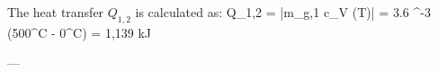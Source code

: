 The heat transfer \( Q_{1,2} \) is calculated as:  
Q_{1,2} = |m_{g,1} \cdot c_V \cdot (\Delta T)|  
= 3.6 ^{-3}  \cdot (500^\circ C - 0^\circ C)  
= 1,139 kJ  

---